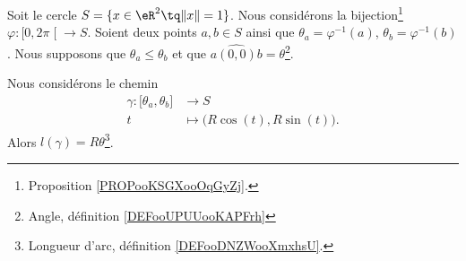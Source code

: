\begin{proposition}     \label{PROPooDMSTooEOFExj}
	Soit le cercle \( S=\{ x\in \eR^2\tq \| x \|=1 \}\). Nous considérons la bijection\footnote{Proposition \ref{PROPooKSGXooOqGyZj}.} \( \varphi\colon \mathopen[ 0 , 2\pi \mathclose[\to S\). Soient deux points \( a,b\in S\) ainsi que \( \theta_a=\varphi^{-1}(a)\), \( \theta_b=\varphi^{-1}(b)\). Nous supposons que \( \theta_a\leq \theta_b\) et que \( \widehat{a(0,0)b}=\theta\)\footnote{Angle, définition \ref{DEFooUPUUooKAPFrh}}.

	Nous considérons le chemin
	\begin{equation}
		\begin{aligned}
			\gamma\colon \mathopen[ \theta_a , \theta_b \mathclose] & \to S                                  \\
			t                                                       & \mapsto \big( R\cos(t),R\sin(t) \big).
		\end{aligned}
	\end{equation}
	Alors \( l(\gamma)=R\theta\)\footnote{Longueur d'arc, définition \ref{DEFooDNZWooXmxhsU}.}.
\end{proposition}

